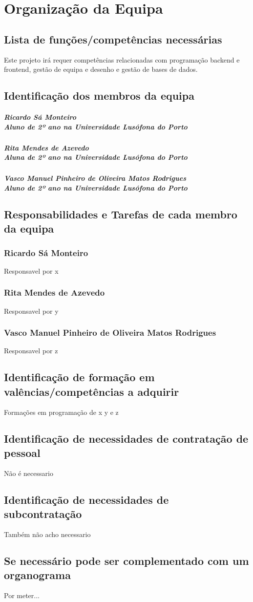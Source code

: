 \chapter{Organização da Equipa}
\label{organizacao_da_equipa}
\section{Lista de funções/competências necessárias}
Este projeto irá requer competências relacionadas com programação backend e frontend, gestão de equipa e desenho e gestão de bases de dados.
\section{Identificação dos membros da equipa}
\paragraph{Ricardo Sá Monteiro 
\\ Aluno de 2º ano na Universidade Lusófona do Porto}
\paragraph{Rita Mendes de Azevedo
\\Aluna de 2º ano na Universidade Lusófona do Porto}
\paragraph{Vasco Manuel Pinheiro de Oliveira Matos Rodrigues
\\Aluno de 2º ano na Universidade Lusófona do Porto}
\section{Responsabilidades e Tarefas de cada membro da equipa}
\subsection{Ricardo Sá Monteiro}
Responsavel por x
\subsection{Rita Mendes de Azevedo}
Responsavel por y
\subsection{Vasco Manuel Pinheiro de Oliveira Matos Rodrigues}
Responsavel por z
\section{Identificação de formação em valências/competências a adquirir}
Formações em programação de x y e z
\section{Identificação de necessidades de contratação de pessoal}
Não é necessario
\section{Identificação de necessidades de subcontratação}
Também não acho necessario
\section{Se necessário pode ser complementado com um organograma}
Por meter...